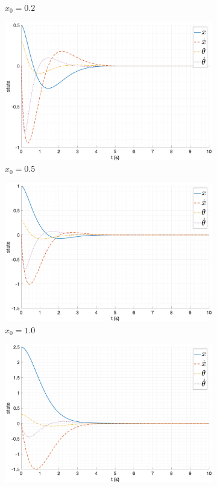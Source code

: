 \begin{figure}[ht!]
\begin{subfigure}[b]{0.45\textwidth}
        \caption{$x_0 = 0.2$}
    \end{subfigure}
    \begin{subfigure}[b]{0.45\textwidth}
        \includegraphics[width=\textwidth]{media/plots/modal_control_initials/state_3.png}
        \caption{$x_0 = 0.5$}
    \end{subfigure}
    \begin{subfigure}[b]{0.45\textwidth}
        \includegraphics[width=\textwidth]{media/plots/modal_control_initials/state_4.png}
        \caption{$x_0 = 1.0$}
    \end{subfigure}
    \begin{subfigure}[b]{0.45\textwidth}
        \includegraphics[width=\textwidth]{media/plots/modal_control_initials/state_5.png}

\end{subfigure}
\end{figure}
